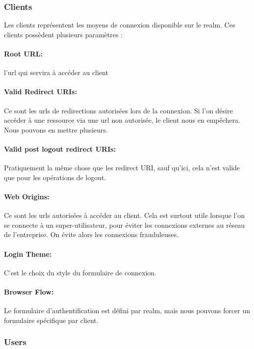 \subsubsection{Clients}

Les clients représentent les moyens de connexion disponible sur le realm. Ces clients possèdent
plusieurs paramètres :

\paragraph{Root URL:} l'url qui servira à accéder au client

\paragraph{Valid Redirect URIs:} Ce sont les urls de redirections autorisées lors de la connexion. Si l'on désire
accéder à une ressource via une url non autorisée, le client nous en empêchera. Nous pouvons en
mettre plusieurs.

\paragraph{Valid post logout redirect URIs:} Pratiquement la même chose que les redirect URI, sauf qu'ici, cela
n'est valide que pour les opérations de logout.

\paragraph{Web Origins:} Ce sont les urls autorisées à accéder au client. Cela est surtout utile lorsque l'on se
connecte à un super-utilisateur, pour éviter les connexions externes au réseau de l'entreprise. On
évite alors les connexions frauduleuses.

\paragraph{Login Theme:} C'est le choix du style du formulaire de connexion.

\paragraph{Browser Flow:} Le formulaire d'authentification est défini par realm, mais nous pouvons forcer un
formulaire spécifique par client.

\subsubsection{Users}

